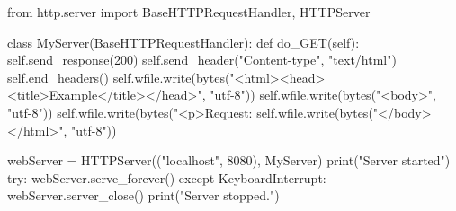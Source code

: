 from http.server import BaseHTTPRequestHandler, HTTPServer

class MyServer(BaseHTTPRequestHandler):
    def do_GET(self):
        self.send_response(200)
        self.send_header("Content-type", "text/html")
        self.end_headers()
        self.wfile.write(bytes("<html><head><title>Example</title></head>", "utf-8"))
        self.wfile.write(bytes("<body>", "utf-8"))
        self.wfile.write(bytes("<p>Request: %
        self.wfile.write(bytes("</body></html>", "utf-8"))

webServer = HTTPServer(("localhost", 8080), MyServer)
print("Server started")
try:
    webServer.serve_forever()
except KeyboardInterrupt:
    webServer.server_close()
    print("Server stopped.")